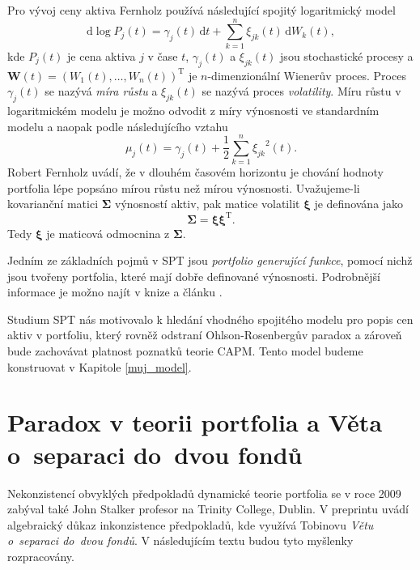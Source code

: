 \documentclass[a4paper,12pt]{report}
\theoremstyle{definition} \newtheorem{definice}[veta]{Definice}
\theoremstyle{remark}
\begin{document}
Pro vývoj ceny aktiva Fernholz používá následující spojitý logaritmický model
$$\mathrm{d}\log P_j(t)=\gamma_j(t)\,\mathrm{d}t+\sum_{k=1}^{n}\xi_{jk}(t)\,\mathrm{d}W_k(t),$$
kde $P_j(t)$ je cena aktiva $j$ v čase $t$, $\gamma_j(t)$ a $\xi_{jk}(t)$ jsou stochastické procesy a $\boldsymbol{W}(t)=(W_1(t),\dots,W_n(t))^\mathrm{T}$ je $n$-dimenzionální Wienerův proces. 
Proces $\gamma_j(t)$ se nazývá \textit{míra růstu} a $\xi_{jk}(t)$ se nazývá proces \textit{volatility}.
Míru růstu v logaritmickém modelu je možno odvodit z míry výnosnosti ve standardním modelu a naopak podle následujícího vztahu
$$\mu_j(t)=\gamma_j(t)+\frac12\sum_{k=1}^{n}{\xi_{jk}}^2(t).$$
Robert Fernholz uvádí, že v dlouhém časovém horizontu je chování hodnoty portfolia lépe popsáno mírou růstu než mírou výnosnosti.
Uvažujeme-li kovarianční matici $\boldsymbol{\Sigma}$ výnosností aktiv, pak matice volatilit $\boldsymbol{\xi}$ je definována jako
$$\boldsymbol{\Sigma}=\boldsymbol{\xi}\boldsymbol{\xi}^\mathrm{T}.$$
Tedy $\boldsymbol{\xi}$ je maticová odmocnina z $\boldsymbol{\Sigma}$.

Jedním ze základních pojmů v SPT jsou \textit{portfolio generující funkce}, pomocí nichž jsou tvořeny portfolia, které mají dobře definované výnosnosti. 
Podrobnější informace je možno najít v knize \cite{fern} a článku \cite{kara}.

Studium SPT nás motivovalo k hledání vhodného spojitého modelu pro popis cen aktiv v portfoliu, který rovněž odstraní Ohlson-Rosenbergův paradox a zároveň bude zachovávat platnost poznatků teorie CAPM.
Tento model budeme konstruovat v Kapitole \ref{muj_model}.




\section{Paradox v teorii portfolia a Věta o~separaci do~dvou fondů} \label{john}
Nekonzistencí obvyklých předpokladů dynamické teorie portfolia se v roce 2009 zabýval také John Stalker profesor na Trinity College, Dublin. 
V preprintu \cite{john} uvádí algebraický důkaz inkonzistence předpokladů, kde využívá Tobinovu \textit{Větu o~separaci do~dvou fondů}. 
V následujícím textu budou tyto myšlenky rozpracovány.
\end{document}
